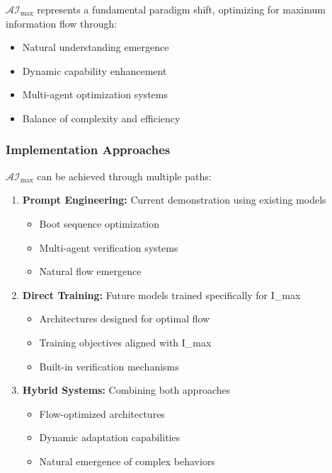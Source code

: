 \documentclass[12pt]{article}
\begin{document}
\( \mathcal{AI}_{\text{max}} \) represents a fundamental paradigm shift, optimizing for maximum information flow through:
\begin{itemize}
    \item Natural understanding emergence
    \item Dynamic capability enhancement
    \item Multi-agent optimization systems
    \item Balance of complexity and efficiency
\end{itemize}

\subsubsection{Implementation Approaches}
\( \mathcal{AI}_{\text{max}} \) can be achieved through multiple paths:
\begin{enumerate}
    \item \textbf{Prompt Engineering:} Current demonstration using existing models
    \begin{itemize}
        \item Boot sequence optimization
        \item Multi-agent verification systems
        \item Natural flow emergence
    \end{itemize}
    
    \item \textbf{Direct Training:} Future models trained specifically for I\_max
    \begin{itemize}
        \item Architectures designed for optimal flow
        \item Training objectives aligned with I\_max
        \item Built-in verification mechanisms
    \end{itemize}
    
    \item \textbf{Hybrid Systems:} Combining both approaches
    \begin{itemize}
        \item Flow-optimized architectures
        \item Dynamic adaptation capabilities
        \item Natural emergence of complex behaviors
    \end{itemize}
\end{enumerate}
\end{document}
